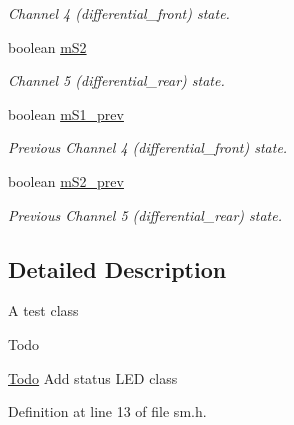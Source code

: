 \begin{DoxyCompactItemize}
\begin{DoxyCompactList}\small\item\em Channel 4 (differential\+\_\+front) state. \end{DoxyCompactList}\item 
boolean \hyperlink{classSPMB_1_1StateMachine_af7fcd1aec80eb5b7397b163db2e7c2ed}{m\+S2}\hypertarget{classSPMB_1_1StateMachine_af7fcd1aec80eb5b7397b163db2e7c2ed}{}\label{classSPMB_1_1StateMachine_af7fcd1aec80eb5b7397b163db2e7c2ed}

\begin{DoxyCompactList}\small\item\em Channel 5 (differential\+\_\+rear) state. \end{DoxyCompactList}\item 
boolean \hyperlink{classSPMB_1_1StateMachine_af6ffc5aa94ef7f423d217f8fba9cb998}{m\+S1\+\_\+prev}\hypertarget{classSPMB_1_1StateMachine_af6ffc5aa94ef7f423d217f8fba9cb998}{}\label{classSPMB_1_1StateMachine_af6ffc5aa94ef7f423d217f8fba9cb998}

\begin{DoxyCompactList}\small\item\em Previous Channel 4 (differential\+\_\+front) state. \end{DoxyCompactList}\item 
boolean \hyperlink{classSPMB_1_1StateMachine_a1d0a5cbe9d61f50e3d0ac3bdca99b936}{m\+S2\+\_\+prev}\hypertarget{classSPMB_1_1StateMachine_a1d0a5cbe9d61f50e3d0ac3bdca99b936}{}\label{classSPMB_1_1StateMachine_a1d0a5cbe9d61f50e3d0ac3bdca99b936}

\begin{DoxyCompactList}\small\item\em Previous Channel 5 (differential\+\_\+rear) state. \end{DoxyCompactList}\end{DoxyCompactItemize}


\subsection{Detailed Description}
A test class

\begin{DoxyRefDesc}{Todo}
\item[\hyperlink{todo__todo000001}{Todo}]Add status L\+ED class \end{DoxyRefDesc}


Definition at line 13 of file sm.\+h.



